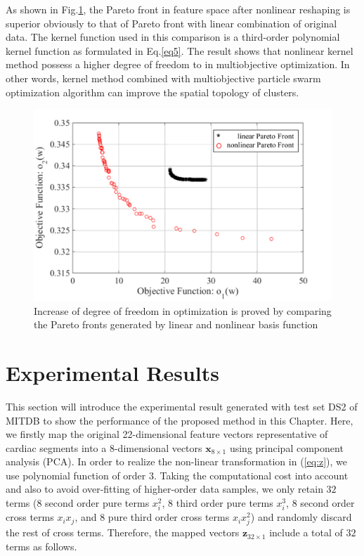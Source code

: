 As shown in Fig.\ref{fig:pareto_compare}, the Pareto front in feature space after nonlinear reshaping is superior obviously to that of Pareto front with linear combination of original data. The kernel function used in this comparison is a third-order polynomial kernel function as formulated in Eq.\ref{eq5}. The result shows that nonlinear kernel method possess a higher degree of freedom to in multiobjective optimization. In other words, kernel method combined with multiobjective particle swarm optimization algorithm can improve the spatial topology of clusters.

\begin{figure}[t]
\centering
\includegraphics[scale=.6]{Fig/pareto_compare.pdf}
\caption{Increase of degree of freedom in optimization is proved by comparing the Pareto fronts generated by linear and nonlinear basis function}
\label{fig:pareto_compare}
\end{figure}

\section{Experimental Results}

This section will introduce the experimental result generated with test set DS2 of MITDB to show the performance of the proposed method in this Chapter. Here, we firstly map the original 22-dimensional feature vectors representative of cardiac segments into a 8-dimensional vectors $\mathbf{x}_{8 \times 1}$ using principal component analysis (PCA). 
In order to realize the non-linear transformation in (\ref{eq:z}), we use polynomial function of order $3$. Taking the computational cost into account and also to avoid over-fitting of higher-order data samples, we only retain $32$ terms (8 second order pure terms $x_i^2$, 8 third order pure terms $x_i^3$, 8 second order cross terms $x_ix_j$, and 8 pure third order cross terms $x_i x_j^2$) and randomly discard the rest of cross terms. Therefore, the mapped vectors $\mathbf{z}_{32 \times 1}$ include a total of $32$ terms as follows.

